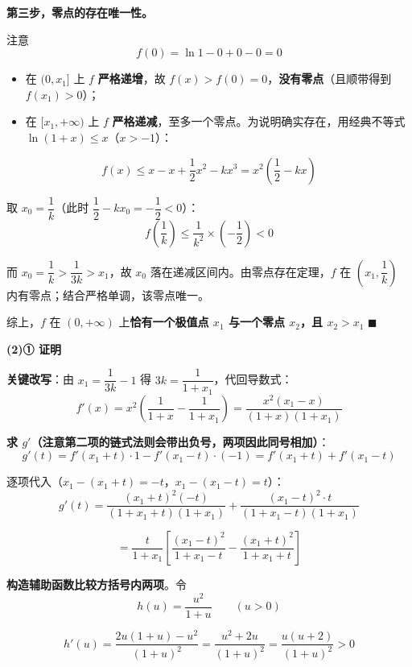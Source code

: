 \begin{answer}
\textbf{第三步，零点的存在唯一性。}

注意
\nopagebreak[4]
\[f(0)=\ln1-0+0-0=0\]

\begin{itemize}
\item 在 $(0,x_1]$ 上 $f$ \textbf{严格递增}，故 $f(x)>f(0)=0$，\textbf{没有零点}（且顺带得到 $f(x_1)>0$）；
\item 在 $[x_1,+\infty)$ 上 $f$ \textbf{严格递减}，至多一个零点。为说明确实存在，用经典不等式 $\ln(1+x)\le x$（$x>-1$）：
\end{itemize}
\nopagebreak[4]
\[f(x)\le x-x+\frac12x^2-kx^3=x^2\left(\frac12-kx\right)\]

取 $x_0=\dfrac1k$（此时 $\dfrac12-kx_0=-\dfrac12<0$）：
\nopagebreak[4]
\[f\left(\frac1k\right)\le\frac1{k^2}\times\left(-\frac12\right)<0\]

而 $x_0=\dfrac1k>\dfrac1{3k}>x_1$，故 $x_0$ 落在递减区间内。由零点存在定理，$f$ 在 $\left(x_1,\dfrac1k\right)$ 内有零点；结合严格单调，该零点唯一。

综上，$f$ 在 $(0,+\infty)$ 上\textbf{恰有一个极值点 $x_1$ 与一个零点 $x_2$，且 $x_2>x_1$} $\blacksquare$

\par\medskip

\textbf{(2)① 证明}

\textbf{关键改写}：由 $x_1=\dfrac1{3k}-1$ 得 $3k=\dfrac1{1+x_1}$，代回导数式：
\nopagebreak[4]
\[f'(x)=x^2\left(\frac1{1+x}-\frac1{1+x_1}\right)=\frac{x^2\left(x_1-x\right)}{(1+x)\left(1+x_1\right)}\]

\textbf{求 $g'$（注意第二项的链式法则会带出负号，两项因此同号相加）}：
\nopagebreak[4]
\[g'(t)=f'\left(x_1+t\right)\cdot 1-f'\left(x_1-t\right)\cdot(-1)=f'\left(x_1+t\right)+f'\left(x_1-t\right)\]

逐项代入（$x_1-\left(x_1+t\right)=-t$，$x_1-\left(x_1-t\right)=t$）：
\nopagebreak[4]
\[g'(t)=\frac{\left(x_1+t\right)^2(-t)}{\left(1+x_1+t\right)\left(1+x_1\right)}+\frac{\left(x_1-t\right)^2\cdot t}{\left(1+x_1-t\right)\left(1+x_1\right)}\]

\nopagebreak[4]
\[=\frac{t}{1+x_1}\left[\frac{\left(x_1-t\right)^2}{1+x_1-t}-\frac{\left(x_1+t\right)^2}{1+x_1+t}\right]\]

\textbf{构造辅助函数比较方括号内两项}。令
\nopagebreak[4]
\[h(u)=\frac{u^2}{1+u}\qquad(u>0)\]

\nopagebreak[4]
\[h'(u)=\frac{2u(1+u)-u^2}{(1+u)^2}=\frac{u^2+2u}{(1+u)^2}=\frac{u(u+2)}{(1+u)^2}>0\]


\end{answer}
